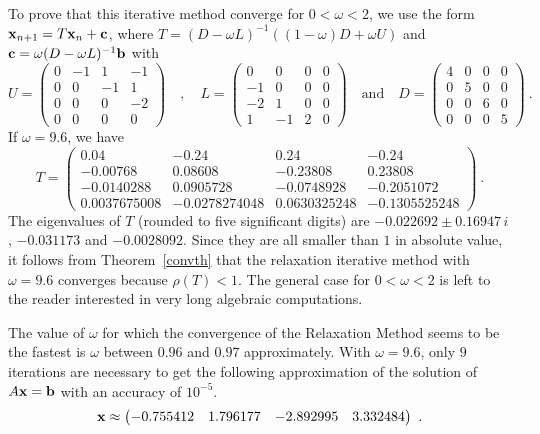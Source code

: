 {To prove that this iterative method converge for $0 < \omega < 2$, we
use the form $\mathbf{x}_{n+1} = T\mathbf{x}_n + \mathbf{c}$, where
$T = (D-\omega L)^{-1}((1-\omega)D + \omega U)$ and 
$\mathbf{c} = \omega (D-\omega L)^{-1}\mathbf{b}$ with
\[
U = \begin{pmatrix} 0 & -1 & 1 & -1 \\ 0 & 0 & -1 & 1 \\
0 & 0 & 0 & -2 \\ 0 & 0 & 0 & 0 \end{pmatrix} \quad ,
\quad L = \begin{pmatrix} 0 & 0 & 0 & 0 \\ -1 & 0 & 0 & 0 \\
-2 & 1 & 0 & 0 \\ 1 & -1 & 2 & 0 \end{pmatrix}  \quad \text{and}
\quad D = \begin{pmatrix} 4 & 0 & 0 & 0 \\ 0 & 5 & 0 & 0 \\
  0 & 0 & 6 & 0 \\ 0 & 0 & 0 & 5 \end{pmatrix} \ .
\]
If $\omega = 9.6$, we have
\[
  T = \begin{pmatrix}
0.04 & -0.24 &  0.24 & -0.24 \\
-0.00768 &  0.08608 & -0.23808 & 0.23808 \\
-0.0140288 &  0.0905728 & -0.0748928 & -0.2051072 \\
0.0037675008 & -0.0278274048 &  0.0630325248 & -0.1305525248
\end{pmatrix} \ .
\]
The eigenvalues of $T$ (rounded to five significant digits) are 
$-0.022692 \pm 0.16947\,i$, $-0.031173$ and $-0.0028092$.  Since
they are all smaller than $1$ in absolute value, it follows from
Theorem~\ref{convth} that the relaxation iterative method with
$\omega = 9.6$ converges because $\rho(T) < 1$.  The general case for
$0 < \omega < 2$ is left to the reader interested in very long
algebraic computations.

The value of $\omega$ for which the convergence of the Relaxation
Method seems to be the fastest is $\omega$ between $0.96$ and $0.97$
approximately.  With $\omega=9.6$, only $9$ iterations are necessary
to get the following approximation of the solution of
$A\mathbf{x} = \mathbf{b}$ with an accuracy of $10^{-5}$.
\[
\mathbf{x} \approx \begin{pmatrix}
-0.755412 & 1.796177 & -2.892995 & 3.332484
\end{pmatrix} \ .
\]
}

